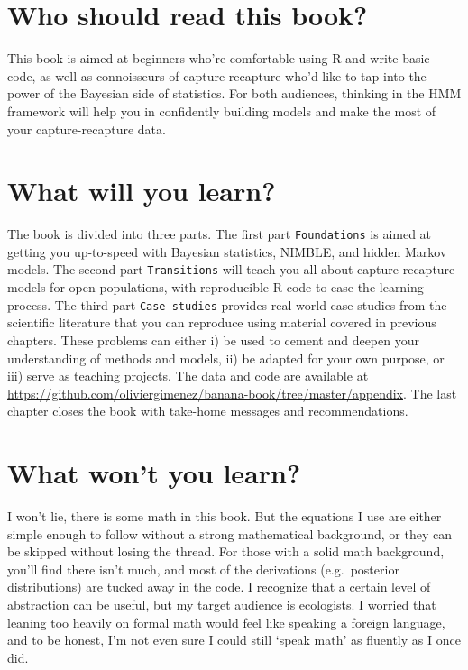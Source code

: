\documentclass[
  12pt,
]{krantz}
\begin{document}
\section*{Who should read this book?}\label{who-should-read-this-book}


This book is aimed at beginners who're comfortable using R and write basic code, as well as connoisseurs of capture-recapture who'd like to tap into the power of the Bayesian side of statistics. For both audiences, thinking in the HMM framework will help you in confidently building models and make the most of your capture-recapture data.

\section*{What will you learn?}\label{what-will-you-learn}


The book is divided into three parts. The first part \texttt{Foundations} is aimed at getting you up-to-speed with Bayesian statistics, NIMBLE, and hidden Markov models. The second part \texttt{Transitions} will teach you all about capture-recapture models for open populations, with reproducible R code to ease the learning process. The third part \texttt{Case\ studies} provides real-world case studies from the scientific literature that you can reproduce using material covered in previous chapters. These problems can either i) be used to cement and deepen your understanding of methods and models, ii) be adapted for your own purpose, or iii) serve as teaching projects. The data and code are available at \url{https://github.com/oliviergimenez/banana-book/tree/master/appendix}. The last chapter closes the book with take-home messages and recommendations.

\section*{What won't you learn?}\label{what-wont-you-learn}


I won't lie, there is some math in this book. But the equations I use are either simple enough to follow without a strong mathematical background, or they can be skipped without losing the thread. For those with a solid math background, you'll find there isn't much, and most of the derivations (e.g.~posterior distributions) are tucked away in the code. I recognize that a certain level of abstraction can be useful, but my target audience is ecologists. I worried that leaning too heavily on formal math would feel like speaking a foreign language, and to be honest, I'm not even sure I could still `speak math' as fluently as I once did.
\end{document}
